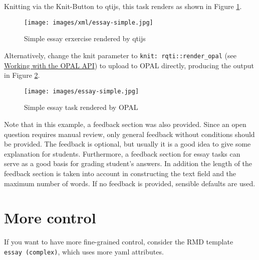 \documentclass[twoside]{tufte-book}
\begin{document}
Knitting via the Knit-Button to qtijs, this task renders as shown in Figure \ref{essay1qtijs}.

\begin{figure}
\centering
\texttt{[image: images/xml/essay-simple.jpg]}
\caption{\label{essay1qtijs}Simple essay erxercise rendered by qtijs}
\end{figure}

\noindent \noindent Alternatively, change the knit parameter to \texttt{knit:\ rqti::render\_opal} (see \href{api_opal.html}{Working with the OPAL API}) to upload to OPAL directly, producing the output in Figure \ref{essay1opal}.

\begin{figure}
\centering
\texttt{[image: images/essay-simple.jpg]}
\caption{\label{essay1opal}Simple essay task rendered by OPAL}
\end{figure}

Note that in this example, a feedback section was also provided. Since an open question requires manual review, only general feedback without conditions should be provided. The feedback is optional, but usually it is a good idea to give some explanation for students. Furthermore, a feedback section for essay tasks can serve as a good basis for grading student's answers. In addition the length of the feedback section is taken into account in constructing the text field and the maximum number of words. If no feedback is provided, sensible defaults are used.

\section{More control}\label{more-control-4}

If you want to have more fine-grained control, consider the RMD template \texttt{essay\ (complex)}, which uses more yaml attributes.
\end{document}
